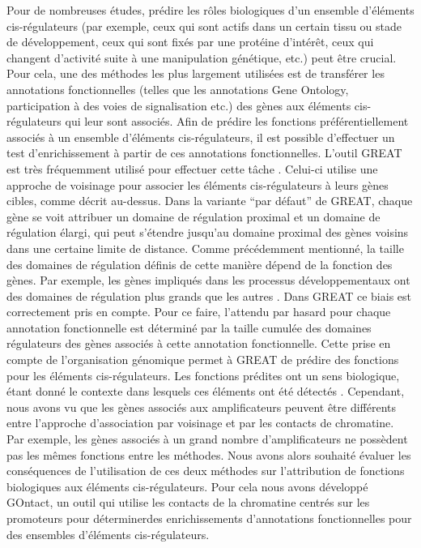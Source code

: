 Pour de nombreuses études, prédire les rôles biologiques d’un ensemble d’éléments \gls{cis}-régulateurs (par exemple, ceux qui sont actifs dans un certain tissu ou stade de développement, ceux qui sont fixés par une protéine d’intérêt, ceux qui changent d’activité suite à une manipulation génétique, etc.) peut être crucial. Pour cela, une des méthodes les plus largement utilisées est de transférer les annotations fonctionnelles (telles que les annotations Gene Ontology, participation à des voies de signalisation etc.) des gènes aux éléments \gls{cis}-régulateurs qui leur sont associés. Afin de prédire les fonctions préférentiellement associés à un ensemble d’éléments \gls{cis}-régulateurs, il est possible d’effectuer un test d’enrichissement à partir de ces annotations fonctionnelles. L’outil GREAT est très fréquemment utilisé pour effectuer cette tâche \citep{mclean_great_2010}. Celui-ci utilise une approche de voisinage pour associer les éléments \gls{cis}-régulateurs à leurs gènes cibles, comme décrit au-dessus. Dans la variante “par défaut” de GREAT, chaque gène se voit attribuer un domaine de régulation proximal et un domaine de régulation élargi, qui peut s’étendre jusqu’au domaine proximal des gènes voisins dans une certaine limite de distance. Comme précédemment mentionné, la taille des domaines de régulation définis de cette manière dépend de la fonction des gènes. Par exemple, les gènes impliqués dans les processus développementaux ont des domaines de régulation plus grands que les autres \citep{mclean_great_2010}. Dans GREAT ce biais est correctement pris en compte. Pour ce faire, l’attendu par hasard pour chaque annotation fonctionnelle est déterminé par la taille cumulée des domaines régulateurs des gènes associés à cette annotation fonctionnelle. Cette prise en compte de l’organisation génomique permet à GREAT de prédire des fonctions pour les éléments \gls{cis}-régulateurs. Les fonctions prédites ont un sens biologique, étant donné le contexte dans lesquels ces éléments ont été détectés \citep{mclean_great_2010, rada-iglesias_unique_2011}. Cependant, nous avons vu que les gènes associés aux amplificateurs peuvent être différents entre l’approche d’association par voisinage et par les contacts de chromatine. Par exemple, les gènes associés à un grand nombre d’amplificateurs ne possèdent pas les mêmes fonctions entre les méthodes. Nous avons alors souhaité évaluer les conséquences de l’utilisation de ces deux méthodes sur l’attribution de fonctions biologiques aux éléments \gls{cis}-régulateurs. Pour cela nous avons développé GOntact, un outil qui utilise les contacts de la chromatine centrés sur les promoteurs pour déterminerdes enrichissements d’annotations fonctionnelles  pour des ensembles d’éléments \gls{cis}-régulateurs.
